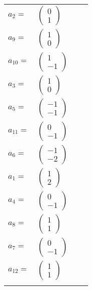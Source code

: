 \documentclass[1p]{elsarticle_modified}
\theoremstyle{definition}
\begin{document}
\begin{tabular}{m{7pt} m{180pt} m{7pt} m{180pt} }
\flushright $a_{2}=$&$\begin{pmatrix}0\\1\end{pmatrix}$ \\
\flushright $a_{9}=$&$\begin{pmatrix}1\\0\end{pmatrix}$ \\
\flushright $a_{10}=$&$\begin{pmatrix}1\\-1\end{pmatrix}$ \\
\flushright $a_{3}=$&$\begin{pmatrix}1\\0\end{pmatrix}$ \\
\flushright $a_{5}=$&$\begin{pmatrix}-1\\-1\end{pmatrix}$ \\
\flushright $a_{11}=$&$\begin{pmatrix}0\\-1\end{pmatrix}$ \\
\flushright $a_{6}=$&$\begin{pmatrix}-1\\-2\end{pmatrix}$ \\
\flushright $a_{1}=$&$\begin{pmatrix}1\\2\end{pmatrix}$ \\
\flushright $a_{4}=$&$\begin{pmatrix}0\\-1\end{pmatrix}$ \\
\flushright $a_{8}=$&$\begin{pmatrix}1\\1\end{pmatrix}$ \\
\flushright $a_{7}=$&$\begin{pmatrix}0\\-1\end{pmatrix}$ \\
\flushright $a_{12}=$&$\begin{pmatrix}1\\1\end{pmatrix}$\\&\end{tabular}
\end{document}
